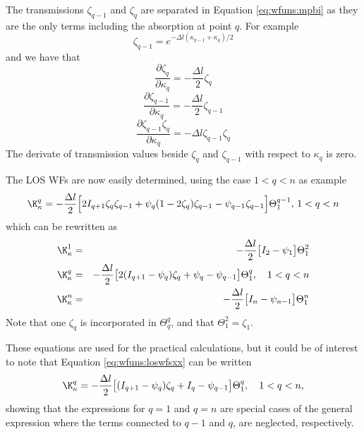  The transmissions $\zeta_{q-1}$ and $\zeta_q$ are separated in Equation
 \ref{eq:wfuns:mpbi} as they are the only terms including the absorption
 at point $q$. For example
 \begin{equation}
   \zeta_{q-1} = e^{-\Delta l(\kappa_{q-1}+\kappa_q)/2}
 \end{equation}
 and we have that
 \begin{equation}
   \frac{\partial \zeta_q}{\partial \kappa_q} = -\frac{\Delta l}{2}\zeta_q
  \label{eq:wfuns:dzeta1}
 \end{equation}
 \begin{equation}
   \frac{\partial\zeta_{q-1}}{\partial \kappa_q}=-\frac{\Delta l}{2}\zeta_{q-1}
 \end{equation}
 \begin{equation}
   \frac{\partial \zeta_{q-1}\zeta_q}{\partial \kappa_q} = 
          -\Delta l \zeta_{q-1}\zeta_q
  \label{eq:wfuns:dzeta2}
 \end{equation}
 The derivate of transmission values beside $\zeta_q$ and
 $\zeta_{q-1}$ with respect to $\kappa_q$ is zero.

 The LOS WFs are now easily determined, using the case $1<q<n$ as example
 \begin{equation}
   \K_{\kappa}^q = -\frac{\Delta l}{2} \Big[ 2I_{q+1}\zeta_q\zeta_{q-1}+
     \psi_q(1-2\zeta_q)\zeta_{q-1} - \psi_{q-1}\zeta_{q-1} \Big] 
     \Theta^{q-1}_1, \, 1<q<n
 \end{equation}
 which can be rewritten as
 \begin{eqnarray}
   \K_{\kappa}^1 &=& -\frac{\Delta l}{2} \big[ I_2-\psi_1 \big] \Theta^2_1 \nonumber \\
   \K_{\kappa}^q &=& -\frac{\Delta l}{2} \big[ 2(I_{q+1}-\psi_q)\zeta_q+
           \psi_q-\psi_{q-1} \big] \Theta^q_1, \quad 1<q<n 
  \label{eq:wfuns:loswfsxx} \\
   \K_{\kappa}^n &=& -\frac{\Delta l}{2} \big[ I_n-\psi_{n-1} \big] \Theta^n_1 \nonumber
 \end{eqnarray}
 Note that one $\zeta_q$ is incorporated in $\Theta^q_q$, and that 
 $\Theta^2_1=\zeta_1$.
 
 These equations are used for the practical calculations, but it could
 be of interest to note that Equation \ref{eq:wfuns:loswfsxx} can be
 written
 \begin{equation}
   \K_{\kappa}^q = -\frac{\Delta l}{2} \big[ (I_{q+1}-\psi_q)\zeta_q+
           I_q-\psi_{q-1} \big] \Theta^q_1, \quad 1<q<n ,
 \end{equation}
 showing that the expressions for $q=1$ and $q=n$ are special cases of
 the general expression where the terms connected to $q-1$ and $q$,
 are neglected, respectively.
 
